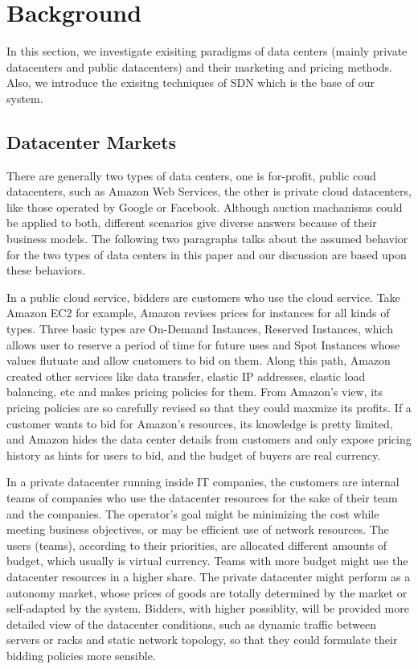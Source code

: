 \documentclass[a4paper,11pt,twocolumn]{article}
\begin{document}
\section{Background}
In this section, we investigate exisiting paradigms of data centers (mainly private datacenters and public datacenters) and their marketing and 
pricing methods. Also, we introduce the exisitng techniques of SDN which is the base of our system.
\subsection{Datacenter Markets}
There are generally two types of data centers, one is for-profit, public coud datacenters, such as Amazon Web Services\cite{aws}, the other is private cloud
datacenters, like those operated by Google or Facebook. Although auction machanisms could be applied to both, different scenarios give diverse answers because of 
their business models. The following two paragraphs talks about the assumed behavior for the two types of data centers in this paper and our discussion are 
based upon these behaviors.

In a public cloud service, bidders are customers who use the cloud service. Take Amazon EC2 for example\cite{ec2}, Amazon revises prices for instances for all kinds
of types. Three basic types are On-Demand Instances, Reserved Instances, which allows user to reserve a period of time for future uses and Spot Instances\cite{spot} whose values 
flutuate and allow customers to bid on them. Along this path, Amazon created other services like data transfer, elastic IP addresses, elastic load balancing, etc and 
makes pricing policies for them. From Amazon's view, its pricing policies are so carefully revised so that they could maxmize its profits. If a customer wants to bid for Amazon's 
resources, its knowledge is pretty limited, and Amazon hides the data center details from customers and only expose pricing history as hints for users to bid, and the budget
of buyers are real currency. 

In a private datacenter running inside IT companies, the customers are internal teams of companies who use the datacenter resources for the sake of their team and the companies.
The operator's goal might be minimizing the cost while meeting business objectives, or may be efficient use of network resources. The users (teams), according to their priorities,
are allocated different amounts of budget, which usually is virtual currency. Teams with more budget might use the datacenter resources in a higher share. The private datacenter 
might perform as a autonomy market, whose prices of goods are totally determined by the market or self-adapted by the system. Bidders, with higher possiblity, will be
provided more detailed view of the datacenter conditions, such as dynamic traffic between servers or racks and static network topology, so that they could formulate their 
bidding policies more sensible. 
\end{document}
